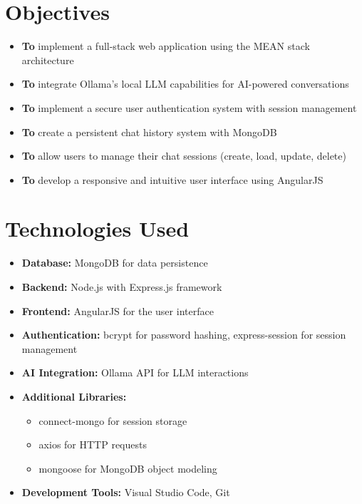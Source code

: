 \documentclass[12pt,a4paper]{article}
\begin{document}
\section{Objectives}
\begin{itemize}
\item \textbf{To} implement a full-stack web application using the MEAN stack architecture
\item \textbf{To} integrate Ollama's local LLM capabilities for AI-powered conversations
\item \textbf{To} implement a secure user authentication system with session management
\item \textbf{To} create a persistent chat history system with MongoDB
\item \textbf{To} allow users to manage their chat sessions (create, load, update, delete)
\item \textbf{To} develop a responsive and intuitive user interface using AngularJS
\end{itemize}

\section{Technologies Used}
\begin{itemize}
\item \textbf{Database:} MongoDB for data persistence
\item \textbf{Backend:} Node.js with Express.js framework
\item \textbf{Frontend:} AngularJS for the user interface
\item \textbf{Authentication:} bcrypt for password hashing, express-session for session management
\item \textbf{AI Integration:} Ollama API for LLM interactions
\item \textbf{Additional Libraries:}
  \begin{itemize}
    \item connect-mongo for session storage
    \item axios for HTTP requests
    \item mongoose for MongoDB object modeling
  \end{itemize}
\item \textbf{Development Tools:} Visual Studio Code, Git
\end{itemize}
\end{document}
